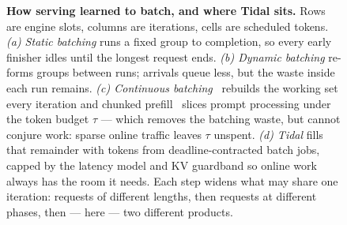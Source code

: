 \begin{figure}[t]
\caption[The batching lineage]{\textbf{How serving learned to batch, and where Tidal
sits.} Rows are engine slots, columns are iterations, cells are scheduled tokens.
\emph{(a) Static batching} runs a fixed group to completion, so every early finisher
idles until the longest request ends. \emph{(b) Dynamic batching} re-forms groups
between runs; arrivals queue less, but the waste inside each run remains. \emph{(c)
Continuous batching}~\citep{orca} rebuilds the working set every iteration and chunked
prefill~\citep{sarathi} slices prompt processing under the token budget $\tau$ ---
which removes the batching waste, but cannot conjure work: sparse online traffic
leaves $\tau$ unspent. \emph{(d) Tidal} fills that remainder with tokens from
deadline-contracted batch jobs, capped by the latency model and KV guardband so online
work always has the room it needs. Each step widens what may share one iteration:
requests of different lengths, then requests at different phases, then --- here ---
two different products.}
\label{fig:batching}
\end{figure}
